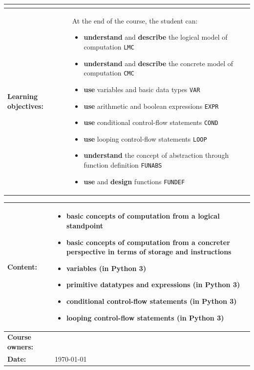 \begin{tabularx}{\textwidth}{|>{\columncolor{lichtGrijs}} p{}|X|}
\begin{center}
	\end{center}\\
	\hline
	\textbf{Learning objectives:} &
		At the end of the course, the student can:
			\begin{itemize}
				\item \textbf{understand} and \textbf{describe} the logical model of computation \texttt{LMC}
				\item \textbf{understand} and \textbf{describe} the concrete model of computation \texttt{CMC}
				\item \textbf{use} variables and basic data types \texttt{VAR}
				\item \textbf{use} arithmetic and boolean expressions \texttt{EXPR}
				\item \textbf{use} conditional control-flow statements \texttt{COND}
				\item \textbf{use} looping control-flow statements \texttt{LOOP}
			        \item \textbf{understand} the concept of abstraction through function definition \texttt{FUNABS}
                                \item \textbf{use} and \textbf{design} functions \texttt{FUNDEF}
			\end{itemize} \\
		
	\hline
\end{tabularx}
\newpage

\begin{tabularx}{\textwidth}{|>{\columncolor{lichtGrijs}} p{}|X|}
	\hline
	\textbf{Content:}&
	\begin{itemize}
		\item basic concepts of computation from a logical standpoint
		\item basic concepts of computation from a concreter perspective in terms of storage and instructions
		\item variables (in Python 3)
		\item primitive datatypes and expressions (in Python 3)
		\item conditional control-flow statements (in Python 3)
		\item looping control-flow statements (in Python 3)
	\end{itemize} \\
	\hline
	\textbf{Course owners:} & \author\\
	\hline
	\textbf{Date:} & \today \\
	\hline
\end{tabularx}
\newpage
